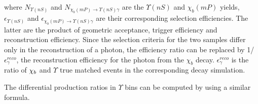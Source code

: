 \noindent where
${N_{\Upsilon(nS)}}$ and ${N_{\chi_b(mP)\to \Upsilon(nS) \gamma}}$ are the
$\Upsilon(nS)$ and $\chi_b(mP)$ yields, $\epsilon_{\Upsilon(nS)}$ and
$\epsilon_{\chi_b(mP)\to \Upsilon(nS) \gamma}$ are their corresponding
selection efficiencies. The latter are the product of geometric acceptance,
trigger efficiency and reconstruction efficiency. Since the selection criteria
for the two samples differ only in the reconstruction of a photon, the
efficiency ratio can be replaced by 1/$\epsilon^{reco}_{\gamma}$, the
reconstruction efficiency for the photon from the $\chi_b$ decay.
$\epsilon^{reco}_{\gamma}$ is the ratio of $\chi_{b}$ and $\Upsilon$ true matched
events in the corresponding decay simulation.

The differential production ratios in $\Upsilon$ \pt bins 
can be computed by using a similar formula.  